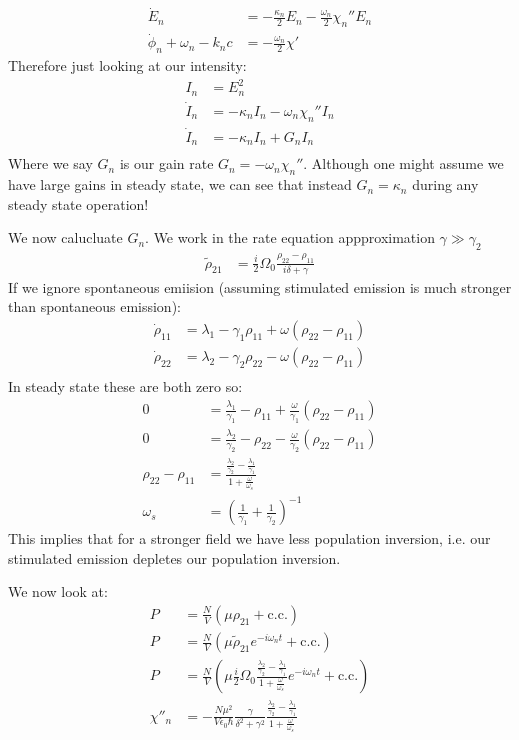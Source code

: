 \begin{align*}
	\dot{E}_n &= -\frac{\kappa_n}{2}E_n - \frac{\omega_n}{2}\chi_n'' E_n \\
	\dot{\phi}_n + \omega_n - k_n c &= -\frac{\omega_n}{2}\chi'
\end{align*}
Therefore just looking at our intensity:
\begin{align*}
	I_n &= E_n^2 \\
	\dot{I}_n &= -\kappa_n I_n -\omega_n\chi_n''I_n \\
	\dot{I}_n &= -\kappa_n I_n +G_n I_n \\
\end{align*}
Where we say $G_n$ is our gain rate $G_n = -\omega_n\chi_n''$. Although one might assume we have large gains in steady state, we can see that instead $G_n = \kappa_n$ during any steady state operation!

We now calucluate $G_n$. We work in the rate equation appproximation $\gamma\gg\gamma_2$
\begin{align*}
	\tilde{\rho}_{21} &= \frac{i}{2}\Omega_0 \frac{\rho_{22} - \rho_{11}}{i\delta + \gamma}
\end{align*}
If we ignore spontaneous emiision (assuming stimulated emission is much stronger than spontaneous emission):
\begin{align*}
	\dot{\rho}_{11} &= \lambda_1 - \gamma_1\rho_{11} + \omega(\rho_{22} - \rho_{11}) \\
	\dot{\rho}_{22} &= \lambda_2 - \gamma_2\rho_{22} - \omega(\rho_{22} - \rho_{11}) \\
\end{align*}
In steady state these are both zero so:
\begin{align*}
	0 &= \frac{\lambda_1}{\gamma_1} - \rho_{11} + \frac{\omega}{\gamma_1}(\rho_{22} - \rho_{11}) \\
	0 &= \frac{\lambda_2}{\gamma_2} - \rho_{22} - \frac{\omega}{\gamma_2}(\rho_{22} - \rho_{11}) \\
	\rho_{22} - \rho_{11} &= \frac{\frac{\lambda_2}{\gamma_2} - \frac{\lambda_1}{\gamma_1}}{1 + \frac{\omega}{\omega_s}} \\
	\omega_s &= \left(\frac{1}{\gamma_1} + \frac{1}{\gamma_2}\right)^{-1}
\end{align*}
This implies that for a stronger field we have less population inversion, i.e. our stimulated emission depletes our population inversion.

We now look at:
\begin{align*}
	P &= \frac{N}{V}(\mu\rho_{21} + \text{c.c.}) \\
	P &= \frac{N}{V}(\mu\tilde{\rho}_{21}e^{-i\omega_n t} + \text{c.c.}) \\
	P &= \frac{N}{V}(\mu \frac{i}{2}\Omega_0\frac{\frac{\lambda_2}{\gamma_2} - \frac{\lambda_1}{\gamma_1}}{1 + \frac{\omega}{\omega_s}} e^{-i\omega_n t} + \text{c.c.}) \\
	\chi''_n &= -\frac{N\mu^2}{V\epsilon_0\hbar} \frac{\gamma}{\delta^2+\gamma^2} \frac{\frac{\lambda_2}{\gamma_2} - \frac{\lambda_1}{\gamma_1}}{1 + \frac{\omega}{\omega_s}}
\end{align*}
